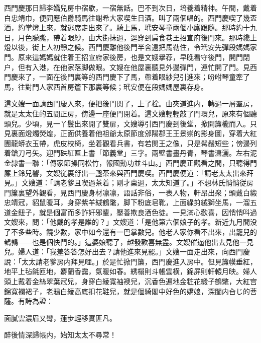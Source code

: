 西門慶那日歸李嬌兒房中宿歇，一宿無話。巴不到次日，培養着精神。午間，戴着白忠靖巾，便同應伯爵騎馬往謝希大家喫生日酒。叫了兩個唱的。西門慶喫了幾盃酒，約掌燈上來，就逃席走出來了。騎上馬，玳安琴童兩個小廝跟隨。那時約十九日，月色朦朧，帶着眼紗，由大街抹過，逕穿到扁食巷王招宣府後門來。那時纔上燈以後，街上人初靜之候。西門慶離他後門半舍遠把馬勒住，令玳安先彈段媽媽家門。原來這媽媽就住着王招宣府家後房，也是文嫂擧荐，早晚看守後門，開門閉户，但有入港，在他家落脚做眼。文嫂在他屋裏聽見外邊彈門，連忙開了門。見西門慶來了，一面在後門裏等的西門慶下了馬，帶着眼紗兒引進來；吩咐琴童牽了馬，往對門人家西首房簷下那裏等候；玳安便在段媽媽屋裏存身。

這文嫂一面請西門慶入來，便把後門関了，上了栓。由夾道進内，轉過一層羣房，就是太太住的五間正房，傍邊一座便門閉着。這文嫂輕輕敲了門環兒，原來有個聽頭兒。少頃，見一丫鬟出來開了雙扉，文嫂導引西門慶到後堂，掀開簾櫳而入。只見裏面燈燭熒煌，正面供養着他祖爺太原節度邠陽郡王王景崇的影身圖，穿着大紅團龍蟒衣玉帶，虎皮校椅，坐着觀看兵書，有若関王之像，只是髯鬚短些；傍邊列着鎗刀弓矢。迎門硃紅匾上書「節義堂」三字。兩壁書畫丹青，琴書潇灑。左右泥金隸書一聯：「傳家節操同松竹，報國勳功並斗山。」西門慶正觀看之間，只聽得門簾上鈴兒響，文嫂従裏㧱出一盞茶來與西門慶喫。西門慶便道：「請老太太出來拜見。」文嫂道：「請老爹且喫過茶着；剛才稟過，太太知道了。」不想林氏悄悄従房門簾裏望外觀看，見西門慶身材凛凛，語話非俗，一表人物，軒昂出衆；頭戴白緞忠靖冠，貂鼠暖耳，身穿紫羊絨鶴氅，脚下粉底皂靴，上面綠剪絨獅坐馬，一溜五道金鈕子，就是個富而多詐奸邪輩，壓善欺良酒色徒。一見滿心歡喜，因悄悄呌過文嫂來，問：「他戴的孝是誰的？」文嫂道：「是他第六個娘子的孝。新近九月間没了不多些時。饒少數，家中如今還有一巴掌數兒。他老人家你看不出來，出籠兒的鵪鶉——也是個快鬥的。」這婆娘聽了，越發歡喜無盡。文嫂催逼他出去見他一見兒。婦人道：「我羞答答怎好出去？請他進來見罷。」文嫂一面走出來，向西門慶說：「太太請老爹房内拜見哩。」於是忙掀門簾，西門慶進入房中。但見簾幙垂紅，地平上毡毹匝地，麝蘭香靄，氣暖如春。綉榻則斗帳雲横，錦屏則軒轅月映。婦人頭上戴着金絲翠葉冠兒，身穿白綾寬袖襖兒，沉香色遍地金粧花緞子鶴氅，大紅宫錦寬襴裙子，老鴉白綾高底扣花鞋兒，就是個綺閣中好色的嬌娘，深閨内㒲じ的菩薩。有詩為證：

面膩雲濃眉又彎，蓮步輕移實匪凡。

醉後情深歸帳内，始知太太不尋常！


